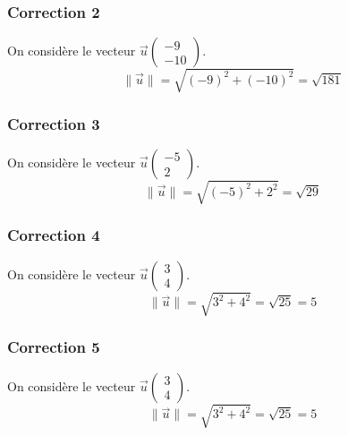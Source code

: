 \documentclass[15pt, mathserif]{beamer}
\begin{document}
\begin{frame}
\vspace{-10mm}
	\frametitle{Correction 2}
On considère le vecteur $\vec{u} \begin{pmatrix} -9 \\ -10 \end{pmatrix}$. $$\|\vec{u}\|=\sqrt{\left(-9\right)^2+\left(-10\right)^2}=\sqrt{181}$$\end{frame}


\begin{frame}
\vspace{-10mm}
	\frametitle{Correction 3}
On considère le vecteur $\vec{u} \begin{pmatrix} -5 \\ 2 \end{pmatrix}$. $$\|\vec{u}\|=\sqrt{\left(-5\right)^2+2^2}=\sqrt{29}$$\end{frame}


\begin{frame}
\vspace{-10mm}
	\frametitle{Correction 4}
On considère le vecteur $\vec{u} \begin{pmatrix} 3 \\ 4 \end{pmatrix}$. $$\|\vec{u}\|=\sqrt{3^2+4^2}=\sqrt{25}=5$$\end{frame}


\begin{frame}
\vspace{-10mm}
	\frametitle{Correction 5}
On considère le vecteur $\vec{u} \begin{pmatrix} 3 \\ 4 \end{pmatrix}$. $$\|\vec{u}\|=\sqrt{3^2+4^2}=\sqrt{25}=5$$\end{frame}
\end{document}
